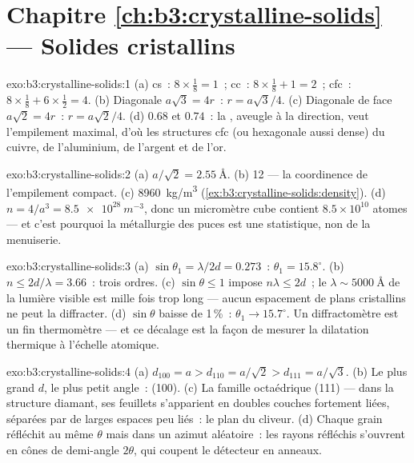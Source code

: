 \section*{Chapitre \ref{ch:b3:crystalline-solids} --- Solides cristallins}

\begin{solution}{exo:b3:crystalline-solids:1}
(a) cs~: $8\times\tfrac18 = 1$~; cc~: $8\times\tfrac18 + 1 = 2$~;
cfc~: $8\times\tfrac18 + 6\times\tfrac12 = 4$. (b) Diagonale
$a\sqrt3 = 4r$~: $r = a\sqrt3/4$. (c) Diagonale de face
$a\sqrt2 = 4r$~: $r = a\sqrt2/4$. (d) $0.68$ et $0.74$~: la , aveugle à la direction, veut l'empilement maximal, d'où
les structures cfc (ou hexagonale aussi dense) du cuivre, de
l'aluminium, de l'argent et de l'or.
\end{solution}

\begin{solution}{exo:b3:crystalline-solids:2}
(a) $a/\sqrt2 = \qty{2.55}{\angstrom}$. (b) 12 --- la coordinence de
l'empilement compact. (c) \qty{8960}{kg/m^3}
(\cref{ex:b3:crystalline-solids:density}). (d) $n = 4/a^3 =
\qty{8.5e28}{m^{-3}}$, donc un micromètre cube contient
$8.5\times10^{10}$ atomes --- et c'est pourquoi la métallurgie des
puces est une statistique, non de la menuiserie.
\end{solution}

\begin{solution}{exo:b3:crystalline-solids:3}
(a) $\sin\theta_1 = \lambda/2d = 0.273$~: $\theta_1 =
15.8^\circ$. (b) $n \le 2d/\lambda = 3.66$~: trois ordres. (c)
$\sin\theta \le 1$ impose $n\lambda \le 2d$~; le
$\lambda \sim \qty{5000}{\angstrom}$ de la lumière visible est mille
fois trop long --- aucun espacement de plans cristallins ne peut la
diffracter. (d) $\sin\theta$ baisse de 1\,\%~:
$\theta_1 \to 15.7^\circ$. Un diffractomètre est un fin thermomètre
--- et ce décalage est la façon de mesurer la dilatation thermique à
l'échelle atomique.
\end{solution}

\begin{solution}{exo:b3:crystalline-solids:4}
(a) $d_{100} = a > d_{110} = a/\sqrt2 > d_{111} = a/\sqrt3$. (b) Le
plus grand $d$, le plus petit angle~: (100). (c) La famille
octaédrique (111) --- dans la structure diamant, ses feuillets
s'apparient en doubles couches fortement liées, séparées par de
larges espaces peu liés~: le plan du cliveur. (d) Chaque grain
réfléchit au même $\theta$ mais dans un azimut aléatoire~: les
rayons réfléchis s'ouvrent en cônes de demi-angle $2\theta$, qui
coupent le détecteur en anneaux.
\end{solution}

